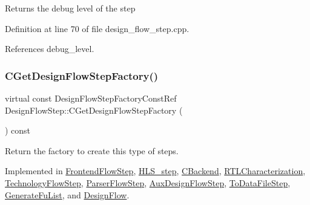 \begin{DoxyReturn}{Returns}
the debug level of the step 
\end{DoxyReturn}


Definition at line 70 of file design\+\_\+flow\+\_\+step.\+cpp.



References debug\+\_\+level.

\mbox{\label{classDesignFlowStep_a5510a8d296670a07f6b53312c448994c}} 
\subsubsection{\texorpdfstring{C\+Get\+Design\+Flow\+Step\+Factory()}{CGetDesignFlowStepFactory()}}
{\footnotesize\ttfamily virtual const Design\+Flow\+Step\+Factory\+Const\+Ref Design\+Flow\+Step\+::\+C\+Get\+Design\+Flow\+Step\+Factory (\begin{DoxyParamCaption}{ }\end{DoxyParamCaption}) const\hspace{0.3cm}{\ttfamily [pure virtual]}}



Return the factory to create this type of steps. 



Implemented in \hyperlink{classFrontendFlowStep_a6d36a52be3de210e018389f802f940a7}{Frontend\+Flow\+Step}, \hyperlink{classHLS__step_a4c959ad5e9f100d5f0b0dd64b9883cd7}{H\+L\+S\+\_\+step}, \hyperlink{classCBackend_ae88e75e47f68079871cad2be17fde136}{C\+Backend}, \hyperlink{classRTLCharacterization_a4a947126e0eb8dd4eb164887a252d597}{R\+T\+L\+Characterization}, \hyperlink{classTechnologyFlowStep_a10c1c680300843016dfcd692831845d0}{Technology\+Flow\+Step}, \hyperlink{classParserFlowStep_a41edd2518ace1ab135ba83ca630540fa}{Parser\+Flow\+Step}, \hyperlink{classAuxDesignFlowStep_a062a1d93bb92d8df06c9cbf6340573ae}{Aux\+Design\+Flow\+Step}, \hyperlink{classToDataFileStep_a2c4090d1f2b890df6a10cc716221c9e9}{To\+Data\+File\+Step}, \hyperlink{classGenerateFuList_a51c1a9b6fe9a61328d6dc99d8e0bd47c}{Generate\+Fu\+List}, and \hyperlink{classDesignFlow_a5c46b102b9346c38c5a85a1841588bda}{Design\+Flow}.

\mbox{\label{classDesignFlowStep_a65bf7bcb603189a7ddcf930c3a9fd7fe}} 
